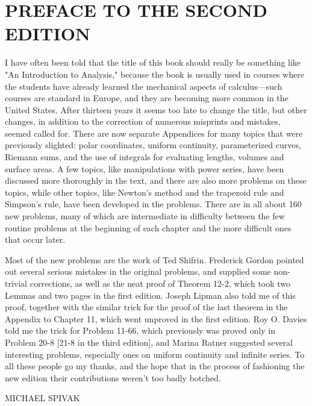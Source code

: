 \section*{PREFACE TO THE SECOND EDITION}

I have often been told that the title of this book should really be something like "An
Introduction to Analysis," because the book is usually used in courses where the
students have already learned the mechanical aspects of calculus—such courses are
standard in Europe, and they are becoming more common in the United States.
After thirteen years it seems too late to change the title, but other changes, in
addition to the correction of numerous misprints and mistakes, seemed called for.
There are now separate Appendices for many topics that were previously slighted:
polar coordinates, uniform continuity, parameterized curves, Riemann sums, and
the use of integrals for evaluating lengths, volumes and surface areas. A few topics,
like manipulations with power series, have been discussed more thoroughly in the
text, and there are also more problems on these topics, while other topics, like
Newton's method and the trapezoid rule and Simpson's rule, have been developed
in the problems. There are in all about 160 new problems, many of which are
intermediate in difficulty between the few routine problems at the beginning of
each chapter and the more difficult ones that occur later.

Most of the new problems are the work of Ted Shifrin. Frederick Gordon
pointed out several serious mistakes in the original problems, and supplied some
non-trivial corrections, as well as the neat proof of Theorem 12-2, which took
two Lemmas and two pages in the first edition. Joseph Lipman also told me
of this proof, together with the similar trick for the proof of the last theorem in
the Appendix to Chapter 11, which went unproved in the first edition. Roy O.
Davies told me the trick for Problem 11-66, which previously was proved only in
Problem 20-8 [21-8 in the third edition], and Marina Ratner suggested several
interesting problems, especially ones on uniform continuity and infinite series. To
all these people go my thanks, and the hope that in the process of fashioning the
new edition their contributions weren't too badly botched.

\vspace{12pt}
\hspace*{\fill}MICHAEL SPIVAK\hspace*{\fill}